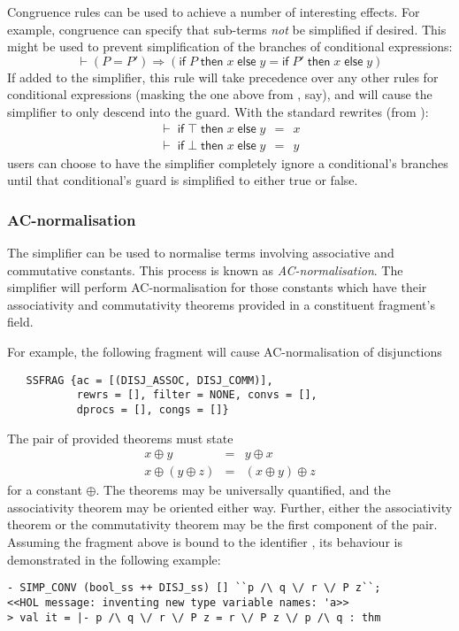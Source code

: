 {Congruence rules can be used to achieve a number of interesting
effects.  For example, congruence can specify that sub-terms
\emph{not} be simplified if desired.  This might be used to prevent
simplification of the branches of conditional expressions:
\[
\vdash (P = P') \Rightarrow
       (\textsf{if}\;P\;\textsf{then}\;x\;\textsf{else}\;y =
       \textsf{if}\;P'\;\textsf{then}\;x\;\textsf{else}\;y)
\]
If added to the simplifier, this rule will take precedence over any
other rules for conditional expressions (masking the one above from
, say), and will cause the simplifier to only descend
into the guard.  With the standard rewrites (from ):
\[
\begin{array}{l}
\vdash \;\textsf{if}\;\top\;\textsf{then}\;x\;\textsf{else}\;y \,\;=\,\; x\\
\vdash \;\textsf{if}\;\bot\;\textsf{then}\;x\;\textsf{else}\;y \,\;=\,\; y
\end{array}
\]
users can choose to have the simplifier completely ignore
a conditional's branches until that conditional's guard is simplified
to either true or false.


\subsubsection{AC-normalisation}

The simplifier can be used to normalise terms involving associative
and commutative constants.  This process is known as
\emph{AC-normalisation}.  The simplifier will perform AC-normalisation
for those constants which have their associativity and commutativity
theorems provided in a constituent \simpset{} fragment's 
field.

For example, the following \simpset{} fragment will cause
AC-normalisation of disjunctions
\begin{hol}
\begin{verbatim}
   SSFRAG {ac = [(DISJ_ASSOC, DISJ_COMM)],
           rewrs = [], filter = NONE, convs = [],
           dprocs = [], congs = []}
\end{verbatim}
\end{hol}
The pair of provided theorems must state
\begin{eqnarray*}
x \oplus y &=& y \oplus x\\
x \oplus (y \oplus z) &=& (x \oplus y) \oplus z
\end{eqnarray*}
for a constant $\oplus$.  The theorems may be universally quantified,
and the associativity theorem may be oriented either way.  Further,
either the associativity theorem or the commutativity theorem may be
the first component of the pair.  Assuming the \simpset{} fragment
above is bound to the \ML{} identifier , its behaviour is
demonstrated in the following example:
\begin{session}
\begin{verbatim}
- SIMP_CONV (bool_ss ++ DISJ_ss) [] ``p /\ q \/ r \/ P z``;
<<HOL message: inventing new type variable names: 'a>>
> val it = |- p /\ q \/ r \/ P z = r \/ P z \/ p /\ q : thm
\end{verbatim}
\end{session}

}

